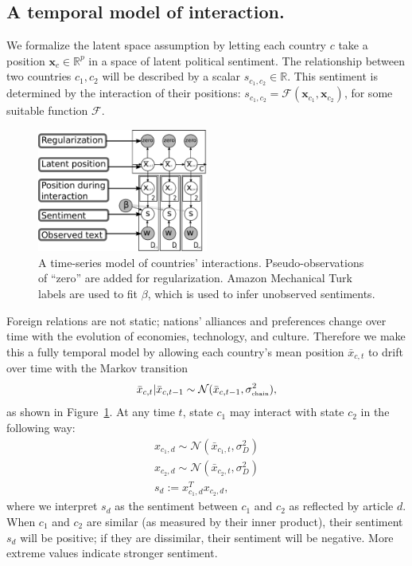 \subsection{A temporal model of interaction.}
We formalize the latent space assumption by letting each country $c$
take a position $\bm x_c \in \mathbb{R}^p$ in a space of latent
political sentiment. The relationship between two countries $c_1, c_2$
will be described by a scalar $s_{c_1,c_2} \in \mathbb{R}$.  This
sentiment is determined by the interaction of their positions:
$s_{c_1, c_2} = \mathcal{F}(\bm x_{c_1}, \bm x_{c_2})$, for some
suitable function $\mathcal{F}$.

\begin{figure}
  \center
  \vspace{-55pt}
  \includegraphics[width=0.5\textwidth]{chapter_foreign_relations/figures/countries_gm.pdf}
  \caption{A time-series model of countries' interactions.
    Pseudo-observations of ``zero'' are added for regularization.
    Amazon Mechanical Turk labels are used to fit $\beta$, which is
    used to infer unobserved sentiments.}
  \label{figure:gm}
\end{figure}


Foreign relations are not static; nations' alliances and preferences
change over time with the evolution of economies, technology, and
culture.  Therefore we make this a fully temporal model by
allowing each country's mean position $\bar x_{c,t}$ to drift over
time with the Markov transition
\begin{align}
  \bar x_{c,t} | \bar x_{c,t-1} \sim \mathcal{N}(\bar x_{c,t-1}, \sigma_{\mbox{\tiny chain}}^2),
\end{align}
as shown in Figure~\ref{figure:gm}. At any time $t$, state $c_1$ may interact with state $c_2$ in the following way:
\begin{align}
  x_{c_1,d} \sim \mathcal{N}(\bar x_{c_1, t}, \sigma_D^2) \nonumber \\
  x_{c_2,d} \sim \mathcal{N}(\bar x_{c_2, t}, \sigma_D^2) \nonumber \\
  s_d := x_{c_1,d}^T x_{c_2,d}, \label{eq:sentiment_space}
\end{align}
where we interpret $s_d$ as the sentiment between $c_1$ and $c_2$ as
reflected by article $d$.  When $c_1$ and $c_2$ are similar (as
measured by their inner product), their sentiment $s_d$ will be
positive; if they are dissimilar, their sentiment will be negative.
More extreme values indicate stronger sentiment.

